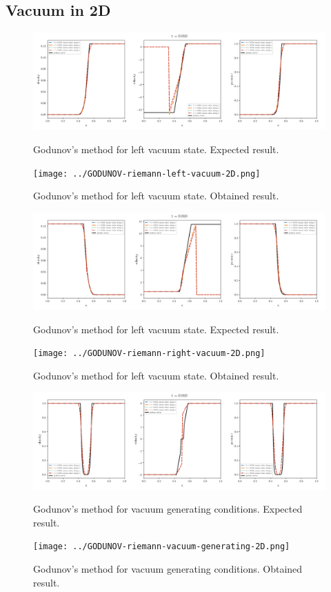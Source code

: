 \clearpage
\subsection{Vacuum in 2D}

\begin{figure}[htbp]
    \centering
	\includegraphics[width=.9\textwidth]{./figures/GODUNOV-riemann-left-vacuum-2D.png}%
	\caption{Godunov's method for left vacuum state. Expected result.}
	\texttt{[image: ../GODUNOV-riemann-left-vacuum-2D.png]}
	\caption{Godunov's method for left vacuum state. Obtained result.}
\end{figure}


\begin{figure}[htbp]
    \centering
	\includegraphics[width=.9\textwidth]{./figures/GODUNOV-riemann-right-vacuum-2D.png}%
	\caption{Godunov's method for left vacuum state. Expected result.}
	\texttt{[image: ../GODUNOV-riemann-right-vacuum-2D.png]}
	\caption{Godunov's method for left vacuum state. Obtained result.}
\end{figure}


\begin{figure}[htbp]
    \centering
	\includegraphics[width=.9\textwidth]{./figures/GODUNOV-riemann-vacuum-generating-2D.png}%
	\caption{Godunov's method for vacuum generating conditions. Expected result.}
	\texttt{[image: ../GODUNOV-riemann-vacuum-generating-2D.png]}%
	\caption{Godunov's method for vacuum generating conditions. Obtained result.}
\end{figure}







